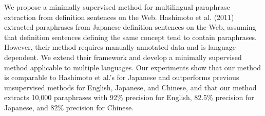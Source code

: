 We propose a minimally supervised method for multilingual paraphrase extraction from definition sentences on the Web. Hashimoto et al. (2011) extracted
 paraphrases from Japanese definition sentences on the Web, assuming that
 definition sentences defining the same concept tend to contain paraphrases.
 However, their method requires manually annotated data and is language
 dependent. We extend their framework and develop a minimally supervised method
 applicable to multiple languages. Our experiments show that our method is
 comparable to Hashimoto et al.'s for Japanese and outperforms previous
 unsupervised methods for English, Japanese, and Chinese, and that our method
 extracts 10,000 paraphrases with 92\% precision for English, 82.5\% precision for
 Japanese, and 82\% precision for Chinese.

